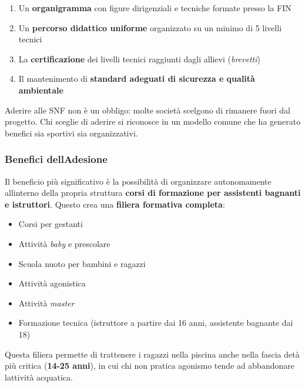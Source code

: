 \documentclass[a4paper,11pt]{article}
\providecommand{\tightlist}{%
  \setlength{\itemsep}{0pt}\setlength{\parskip}{0pt}}
\begin{document}
\begin{enumerate}
      \tightlist
      \item
            Un \textbf{organigramma} con figure dirigenziali e tecniche formate
            presso la FIN
      \item
            Un \textbf{percorso didattico uniforme} organizzato su un minimo di 5
            livelli tecnici
      \item
            La \textbf{certificazione} dei livelli tecnici raggiunti dagli allievi
            (\emph{brevetti})
      \item
            Il mantenimento di \textbf{standard adeguati di sicurezza e qualità
                  ambientale}
\end{enumerate}

Aderire alle SNF non è un obbligo: molte società scelgono di rimanere
fuori dal progetto. Chi sceglie di aderire si riconosce in un modello
comune che ha generato benefici sia sportivi sia organizzativi.

\subsubsection{Benefici
      dell\textquotesingle Adesione}\label{benefici-delladesione}

Il beneficio più significativo è la possibilità di organizzare
autonomamente all\textquotesingle interno della propria struttura
\textbf{corsi di formazione per assistenti bagnanti e istruttori}.
Questo crea una \textbf{filiera formativa completa}:

\begin{itemize}
      \tightlist
      \item
            Corsi per gestanti
      \item
            Attività \emph{baby} e prescolare
      \item
            Scuola nuoto per bambini e ragazzi
      \item
            Attività agonistica
      \item
            Attività \emph{master}
      \item
            Formazione tecnica (istruttore a partire dai 16 anni, assistente
            bagnante dai 18)
\end{itemize}

Questa filiera permette di trattenere i ragazzi nella piscina anche
nella fascia d\textquotesingle età più critica (\textbf{14-25 anni}), in
cui chi non pratica agonismo tende ad abbandonare
l\textquotesingle attività acquatica.
\end{document}
